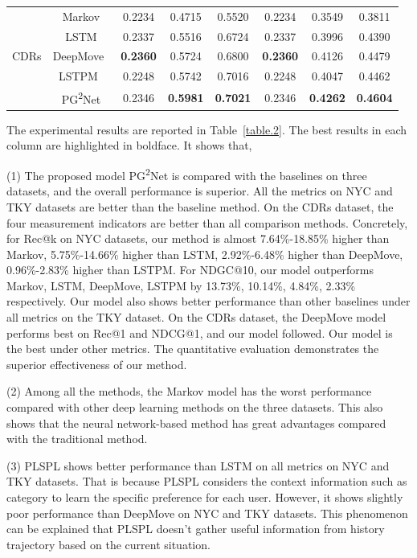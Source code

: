 \documentclass[10pt,journal,compsoc]{IEEEtran}
\begin{document}
\begin{table}[htpb]
{\begin{tabular}{lccccccc}
\multicolumn{1}{l|}{}        & Markov    & 0.2234 & 0.4715 & 0.5520 & 0.2234 & 0.3549 & 0.3811  \\
\multicolumn{1}{l|}{}        & LSTM      & 0.2337 & 0.5516 & 0.6724 & 0.2337 & 0.3996 & 0.4390  \\
\multicolumn{1}{c|}{CDRs}     & DeepMove~\cite{feng2018deepmove}  & \textbf{0.2360} & 0.5724 & 0.6800 & \textbf{0.2360} & 0.4126 & 0.4479  \\
\multicolumn{1}{l|}{}        & LSTPM~\cite{sun2020go}     & 0.2248 & 0.5742 & 0.7016 & 0.2248 & 0.4047 & 0.4462  \\
\multicolumn{1}{l|}{}        & PG\textsuperscript{2}Net & 0.2346 & \textbf{0.5981} & \textbf{0.7021} & 0.2346 & \textbf{0.4262} & \textbf{0.4604}  \\ \hline
\end{tabular}
}
\end{table}

The experimental results are reported in Table~\ref{table.2}. The best results in each column are highlighted in boldface. It shows that, 

(1)	The proposed model PG\textsuperscript{2}Net is compared with the baselines on three datasets, and the overall performance is superior. All the metrics on NYC and TKY datasets are better than the baseline method. On the CDRs dataset, the four measurement indicators are better than all comparison methods. Concretely, for Rec@k on NYC datasets, our method is almost 7.64\%-18.85\% higher than Markov, 5.75\%-14.66\% higher than LSTM, 2.92\%-6.48\% higher than DeepMove, 0.96\%-2.83\% higher than LSTPM. For NDGC@10, our model outperforms Markov, LSTM, DeepMove, LSTPM by 13.73\%, 10.14\%, 4.84\%, 2.33\% respectively. Our model also shows better performance than other baselines under all metrics on the TKY dataset. On the CDRs dataset, the DeepMove model performs best on Rec@1 and NDCG@1, and our model followed. Our model is the best under other metrics. The quantitative evaluation demonstrates the superior effectiveness of our method.

(2)	Among all the methods, the Markov model has the worst performance compared with other deep learning methods on the three datasets. This also shows that the neural network-based method has great advantages compared with the traditional method.

(3)	PLSPL shows better performance than LSTM on all metrics on NYC and TKY datasets. That is because PLSPL considers the context information such as category to learn the specific preference for each user. However, it shows slightly poor performance than DeepMove on NYC and TKY datasets. This phenomenon can be explained that PLSPL doesn't gather useful information from history trajectory based on the current situation.
\end{document}
